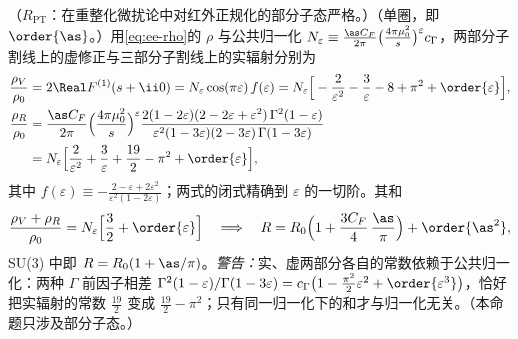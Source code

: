 \begin{proposition}\label{prop:ee-oneloop}
（$R_{\mathrm{PT}}$：在重整化微扰论中对红外正规化的部分子态严格。）（单圈，即 $\order{\as}$。）用\cref{eq:ee-rho}的 $\rho$ 与公共归一化 $N_\varepsilon\equiv\frac{\as C_F}{2\pi}\big(\frac{4\pi\mu_0^2}{s}\big)^{\varepsilon}c_\Gamma$，两部分子割线上的虚修正与三部分子割线上的实辐射分别为
\begin{align}
\frac{\rho_V}{\rho_0}&=2\Real F^{(1)}(s+\ii0)=N_\varepsilon\cos(\pi\varepsilon)\,f(\varepsilon)=N_\varepsilon\Big[-\frac2{\varepsilon^2}-\frac3\varepsilon-8+\pi^2+\order{\varepsilon}\Big], \label{eq:ee-virt}\\
\frac{\rho_R}{\rho_0}&=\frac{\as C_F}{2\pi}\Big(\frac{4\pi\mu_0^2}{s}\Big)^{\varepsilon}\frac{2(1-2\varepsilon)(2-2\varepsilon+\varepsilon^2)\,\Gamma^2(1-\varepsilon)}{\varepsilon^2(1-3\varepsilon)(2-3\varepsilon)\,\Gamma(1-3\varepsilon)}\notag\\
&=N_\varepsilon\Big[\frac2{\varepsilon^2}+\frac3\varepsilon+\frac{19}2-\pi^2+\order{\varepsilon}\Big], \label{eq:ee-real}
\end{align}
其中 $f(\varepsilon)\equiv-\frac{2-\varepsilon+2\varepsilon^2}{\varepsilon^2(1-2\varepsilon)}$；两式的闭式精确到 $\varepsilon$ 的一切阶。其和
\begin{equation}\label{eq:ee-R1}
\frac{\rho_V+\rho_R}{\rho_0}=N_\varepsilon\Big[\frac32+\order{\varepsilon}\Big]\quad\Longrightarrow\quad R=R_0\Big(1+\frac{3C_F}4\,\frac{\as}\pi\Big)+\order{\as^2},
\end{equation}
SU(3) 中即 $R=R_0(1+\as/\pi)$。\emph{警告：}实、虚两部分各自的常数依赖于公共归一化：两种 $\Gamma$ 前因子相差 $\Gamma^2(1-\varepsilon)/\Gamma(1-3\varepsilon)=c_\Gamma\big(1-\frac{\pi^2}2\varepsilon^2+\order{\varepsilon^3}\big)$，恰好把实辐射的常数 $\frac{19}2$ 变成 $\frac{19}2-\pi^2$；只有同一归一化下的和才与归一化无关。（本命题只涉及部分子态。）
\end{proposition}
